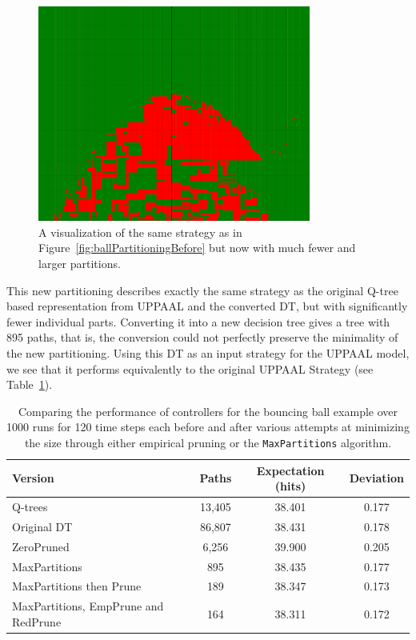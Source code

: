 \documentclass{article}
\begin{document}
\begin{figure}[h]
    \centering
    \includegraphics[width=0.8\textwidth]{ballPartitioningAfter}
    \caption{%
        A visualization of the same strategy as in
        Figure~\ref{fig:ballPartitioningBefore} but now with much fewer and
        larger partitions.
    }\label{fig:ballPartitioningAfter}
\end{figure}

This new partitioning describes exactly the same strategy as the original
Q-tree based representation from UPPAAL and the converted DT, but with
significantly fewer individual parts. Converting it into a new decision tree
gives a tree with 895 paths, that is, the conversion could not perfectly
preserve the minimality of the new partitioning. Using this DT as an input
strategy for the UPPAAL model, we see that it performs equivalently to the
original UPPAAL Strategy (see Table~\ref{tab:minimizedResults}).

\begin{table}[h!]
    \centering
    \caption{%
        Comparing the performance of controllers for the bouncing ball example
        over 1000 runs for 120 time steps each before and after various attempts
        at minimizing the size through either empirical pruning or the
        \texttt{MaxPartitions} algorithm.
    }\label{tab:minimizedResults}
    \begin{tabular}[t]{lccc}
        \toprule
        Version & Paths & Expectation (hits) & Deviation \\
        \midrule
        Q-trees & 13,405 & 38.401 & 0.177 \\
        Original DT & 86,807 & 38.431 & 0.178 \\
        ZeroPruned & 6,256 & 39.900 & 0.205 \\
        MaxPartitions & 895 & 38.435 & 0.177 \\
        MaxPartitions then Prune & 189 & 38.347 & 0.173 \\
        MaxPartitions, EmpPrune and RedPrune & 164 & 38.311 & 0.172 \\
        \bottomrule
    \end{tabular}
\end{table}
\end{document}
